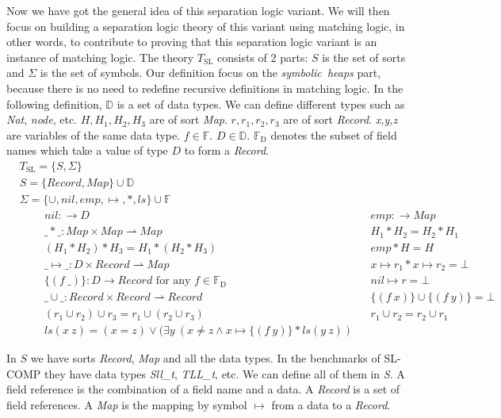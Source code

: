 \documentclass{article}
\theoremstyle{plain}
\begin{document}
Now we have got the general idea of this separation logic variant. We will then focus on building a separation logic theory of this variant using matching logic, in other words, to contribute to proving that this separation logic variant is an instance of matching logic. The theory $T_{\mathrm{SL}}$ consists of 2 parts: $S$ is the set of sorts and $\Sigma$ is the set of symbols. Our definition focus on the \textit{symbolic\ heaps} part, because there is no need to redefine recursive definitions in matching logic. In the following definition, $\mathbb{D}$ is a set of data types. We can define different types such as \textit{Nat}, \textit{node}, etc. $\mathit{H,H_1,H_2,H_3}$ are of sort \textit{Map}. $\mathit{r,r_1,r_2,r_3}$ are of sort \textit{Record}. \textit{x,y,z} are variables of the same data type.  $f\in\mathbb{F}$. $D\in\mathbb{D}$. $\mathbb{F_\mathrm{D}}$ denotes the subset of field names which take a value of type $D$ to form a \textit{Record}.
\begin{align*}
&T_{\mathrm{SL}} =  \{ S , \Sigma \}\\
& S =  \{ \mathit{Record} , \mathit{Map} \} \cup  \mathbb{D }\\
&\Sigma = \{\cup , \mathit{nil} , \mathit{emp} , \mapsto ,  \mathit{*} , \mathit{ls}\}\cup  \mathbb{F }\\
&\qquad\ nil:\to\mathit{D} & &\mathit{emp}:\to \mathit{Map} \\ 
&\qquad\ \_*\_:\mathit{Map}\times\mathit{Map}\rightharpoonup Map& &\mathit{H_1 * H_2 = H_2 * H_1}\\
&\qquad\ (H_1 * H_2) * H_3 = H_1 * (H_2 * H_3)& & \mathit{emp}*\mathit{H}=\mathit{H}\\
&\qquad\ \_ \mapsto \_ :D\times Record \rightharpoonup Map& & x \mapsto r_1 * x \mapsto r_2 = \bot\\
&\qquad\ \{(f\ \_)\}:\mathit{D} \to \mathit{Record}\text{\ \ for any }f\in\mathbb{F_\mathrm{D}} & &nil \mapsto r = \bot
\\
&\qquad\ \_\cup\_:\mathit{Record}\times\mathit{Record}\rightharpoonup\mathit{Record}& &\{(f\ x)\}\cup\{(f\ y)\} = \bot\\
&\qquad\ (r_1 \cup r_2) \cup r_3 = r_1 \cup (r_2 \cup r_3)& &r_1 \cup r_2 = r_2 \cup r_1
\\&\qquad\ \mathit{ls} (x\ z) = (x = z)\vee ( \exists y\ (x \ne z \wedge x \mapsto \{( f\ y)\} *\mathit{ls} (y\ z))
\end{align*}

In $S$ we have sorts \textit{Record}, \textit{Map} and all the data types. In the benchmarks of SL-COMP they have data types \textit{Sll\_t}, \textit{TLL\_t}, etc. We can define all of them in \textit{S}. A field reference is the combination of a field name and a data. A \textit{Record} is a set of field references. A \textit{Map} is the mapping by symbol $\mapsto$ from a data to a \textit{Record}. 
\end{document}
